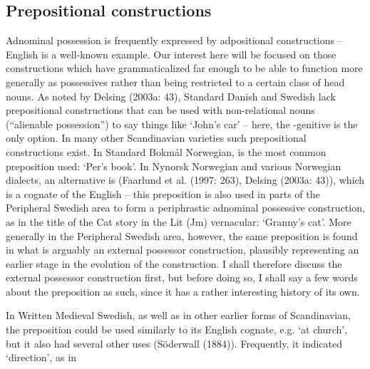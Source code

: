 \subsection[Prepositional constructions]{\rmfamily Prepositional constructions}
\label{bkm:Ref136433022}%
Adnominal possession is frequently expressed by adpositional constructions – English is a well-known example. Our interest here will be focused on those constructions which have grammaticalized far enough to be able to function more generally as possessives rather than being restricted to a certain class of head nouns. As noted by Delsing (2003a: 43), Standard Danish and Swedish lack prepositional constructions that can be used with non-relational nouns (“alienable possession”) to say things like ‘John’s car’ – here, the -genitive is the only option. In many other Scandinavian varieties such prepositional constructions exist. In Standard Bokmål Norwegian,  is the most common preposition used:  ‘Per’s book’. In Nynorsk Norwegian and various Norwegian dialects, an alternative is (Faarlund et al. (1997: 263), Delsing (2003a: 43)), which is a cognate of the English  – this preposition is also used in parts of the Peripheral Swedish area to form a periphrastic adnominal possessive construction, as in the title of the Cat story in the Lit (Jm) vernacular: ‘Granny’s cat’. More generally in the Peripheral Swedish area, however, the same preposition is found in what is arguably an external possessor construction, plausibly representing an earlier stage in the evolution of the construction. I shall therefore discuss the external possessor construction first, but before doing so, I shall say a few words about the preposition as such, since it has a rather interesting history of its own. 

In Written Medieval Swedish, as well as in other earlier forms of Scandinavian, the preposition  could be used similarly to its English cognate, e.g.  ‘at church’, but it also had several other uses (Söderwall (1884)). Frequently, it indicated ‘direction’, as in

